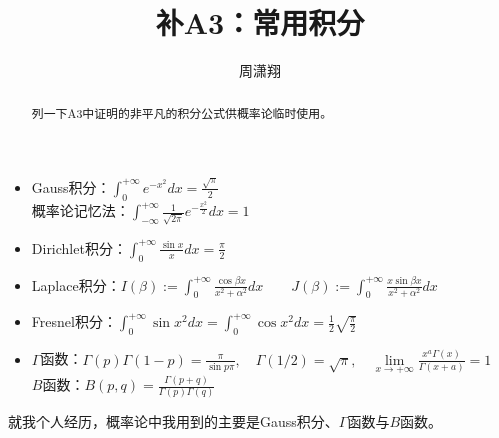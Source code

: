 \documentclass[11pt,A4paper,oneside]{amsart}
\numberwithin{equation}{section}
\theoremstyle{plain}
\theoremstyle{plain}
\numberwithin{equation}{section}
\theoremstyle{remark}
\begin{document}
\title[]{\LARGE 补A3：常用积分}


\author[]{\large 周潇翔}
\address{School of Mathematical Sciences\\
University of Science and Technology of China\\
Hefei, 230026\\ P.R. China\\}
\maketitle




\begin{abstract}
列一下A3中证明的非平凡的积分公式供概率论临时使用。
\end{abstract}








\begin{itemize}
	\item Gauss积分：$\displaystyle \int_{0}^{+\infty} e^{-x^2}dx= \frac{\sqrt{\pi}}{2}$\\
	概率论记忆法：$\displaystyle \int_{-\infty}^{+\infty} \frac{1}{\sqrt{2\pi}}e^{-\frac{x^2}{2}}dx= 1$
	\item Dirichlet积分：$\displaystyle \int_{0}^{+\infty} \frac{\sin x}{x} dx=\frac{\pi}{2}$
	\item Laplace积分：$\displaystyle I(\beta):=\int_{0}^{+\infty} \frac{\cos \beta x}{x^2+\alpha^2} dx\qquad 
	J(\beta):=\int_{0}^{+\infty} \frac{x\sin \beta x}{x^2+\alpha^2} dx$
	\item Fresnel积分：$\displaystyle \int_{0}^{+\infty} \sin x^2dx= \int_{0}^{+\infty} \cos x^2dx=\frac{1}{2}\sqrt{\frac{\pi}{2}}$
	\item $\Gamma$函数：$\Gamma(p)\Gamma(1-p)=\frac{\pi}{\sin p\pi},\quad \Gamma(1/2)=\sqrt{\pi},\quad \lim\limits_{x \rightarrow +\infty} \frac{x^a \Gamma(x)}{\Gamma(x+a)}=1$\\
	$B$函数：$B(p,q)=\frac{\Gamma(p+q)}{\Gamma(p)\Gamma(q)}$
\end{itemize}
就我个人经历，概率论中我用到的主要是Gauss积分、$\Gamma$函数与$B$函数。



\end{document}

